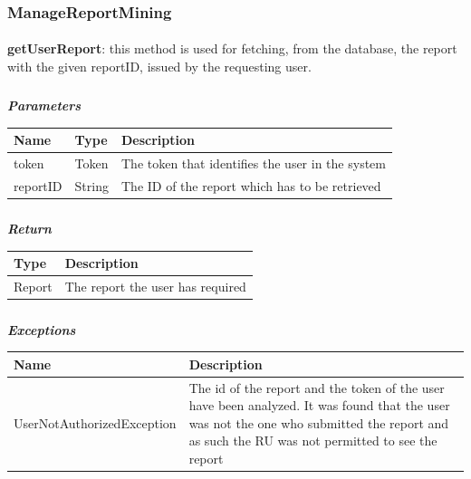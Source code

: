 				\subsubsection{ManageReportMining}
					\paragraph{}
							\textbf{getUserReport}: this method is used for fetching, from the database, the report with the given reportID, issued by the requesting user.
							\subparagraph{}
							\vspace{-3mm}
							\textit{\textbf{Parameters}}
							\vspace{-2mm}
								\begin{table}[!h]
									\begin{tabular}{L{0.15\textwidth}L{0.15\textwidth}L{0.5\textwidth}}
										\toprule
										\textbf{Name} & \textbf{Type} & \textbf{Description} \\
										\midrule
								  		token & Token & The token that identifies the user in the system \\
								  		reportID & String & The ID of the report which has to be retrieved \\
								 		\bottomrule
									\end{tabular}
								\end{table}
							\subparagraph{}
							\vspace{-6mm}
								\textit{\textbf{Return}}
								\vspace{-2mm}
									\begin{table}[!h]
									\begin{tabular}{L{0.2\textwidth}L{0.6\textwidth}}
										\toprule
										\textbf{Type} & \textbf{Description} \\
										\midrule
								  		Report & The report the user has required \\
								 		\bottomrule
									\end{tabular}
								\end{table}
							\subparagraph{}
							\vspace{-6mm}
								\textit{\textbf{Exceptions}}
								\vspace{-2mm}
									\begin{table}[!h]
									\begin{tabular}{L{0.4\textwidth}L{0.4\textwidth}}
										\toprule
										\textbf{Name} & \textbf{Description} \\
										\midrule
								  	UserNotAuthorizedException & The id of the report and the token of the user have been analyzed. It was found that the user was not the one who submitted the report and as such the RU was not permitted to see the report  \\
								 		\bottomrule
									\end{tabular}
								\end{table}
								
